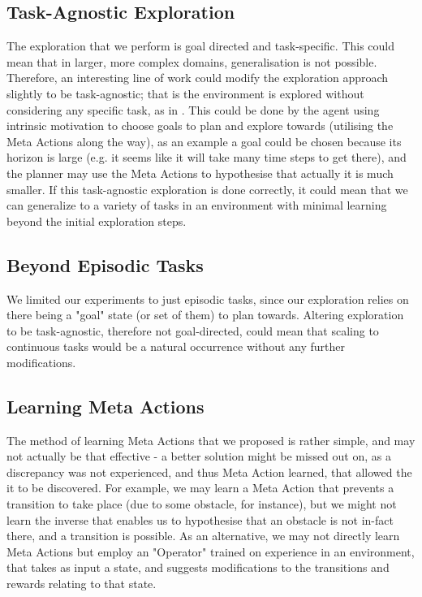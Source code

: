 \subsection{Task-Agnostic Exploration}
The exploration that we perform is goal directed and task-specific. This could mean that in larger, more complex domains, generalisation is not possible. Therefore, an interesting line of work could modify the exploration approach slightly to be task-agnostic; that is the environment is explored without considering any specific task, as in \cite{plan2explore}. This could be done by the agent using intrinsic motivation to choose goals to plan and explore towards (utilising the Meta Actions along the way), as an example a goal could be chosen because its horizon is large (e.g. it seems like it will take many time steps to get there), and the planner may use the Meta Actions to hypothesise that actually it is much smaller. If this task-agnostic exploration is done correctly, it could mean that we can generalize to a variety of tasks in an environment with minimal learning beyond the initial exploration steps.
\subsection{Beyond Episodic Tasks}
We limited our experiments to just episodic tasks, since our exploration relies on there being a "goal" state (or set of them) to plan towards. Altering exploration to be task-agnostic, therefore not goal-directed, could mean that scaling to continuous tasks would be a natural occurrence without any further modifications.
\subsection{Learning Meta Actions}
The method of learning Meta Actions that we proposed is rather simple, and may not actually be that effective - a better solution might be missed out on, as a discrepancy was not experienced, and thus Meta Action learned, that allowed the it to be discovered. For example, we may learn a Meta Action that prevents a transition to take place (due to some obstacle, for instance), but we might not learn the inverse that enables us to hypothesise that an obstacle is not in-fact there, and a transition is possible. As an alternative, we may not directly learn Meta Actions but employ an "Operator" trained on experience in an environment, that takes as input a state, and suggests modifications to the transitions and rewards relating to that state.